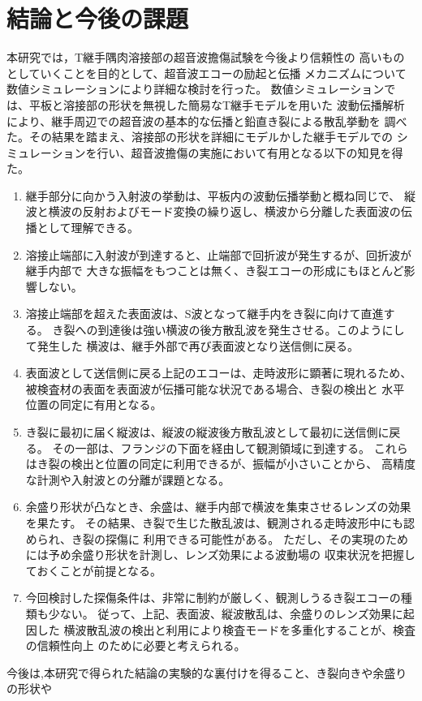 ﻿\documentclass[11pt,a4j]{mybook2}
\begin{document}
\chapter{結論と今後の課題}
本研究では，T継手隅肉溶接部の超音波擔傷試験を今後より信頼性の
高いものとしていくことを目的として、超音波エコーの励起と伝播
メカニズムについて数値シミュレーションにより詳細な検討を行った。
数値シミュレーションでは、平板と溶接部の形状を無視した簡易なT継手モデルを用いた
波動伝播解析により、継手周辺での超音波の基本的な伝播と鉛直き裂による散乱挙動を
調べた。その結果を踏まえ、溶接部の形状を詳細にモデルかした継手モデルでの
シミュレーションを行い、超音波擔傷の実施において有用となる以下の知見を得た。
\begin{enumerate}
\item
	継手部分に向かう入射波の挙動は、平板内の波動伝播挙動と概ね同じで、
	縦波と横波の反射およびモード変換の繰り返し、横波から分離した表面波の伝播として理解できる。
\item
	溶接止端部に入射波が到達すると、止端部で回折波が発生するが、回折波が継手内部で
	大きな振幅をもつことは無く、き裂エコーの形成にもほとんど影響しない。
\item
	溶接止端部を超えた表面波は、S波となって継手内をき裂に向けて直進する。
	き裂への到達後は強い横波の後方散乱波を発生させる。このようにして発生した
	横波は、継手外部で再び表面波となり送信側に戻る。
\item
	表面波として送信側に戻る上記のエコーは、走時波形に顕著に現れるため、
	被検査材の表面を表面波が伝播可能な状況である場合、き裂の検出と
	水平位置の同定に有用となる。
\item
	き裂に最初に届く縦波は、縦波の縦波後方散乱波として最初に送信側に戻る。
	その一部は、フランジの下面を経由して観測領域に到達する。
	これらはき裂の検出と位置の同定に利用できるが、振幅が小さいことから、
	高精度な計測や入射波との分離が課題となる。
\item
	余盛り形状が凸なとき、余盛は、継手内部で横波を集束させるレンズの効果を果たす。
	その結果、き裂で生じた散乱波は、観測される走時波形中にも認められ、き裂の探傷に
	利用できる可能性がある。
	ただし、その実現のためには予め余盛り形状を計測し、レンズ効果による波動場の
	収束状況を把握しておくことが前提となる。
\item
	今回検討した探傷条件は、非常に制約が厳しく、観測しうるき裂エコーの種類も少ない。
	従って、上記、表面波、縦波散乱は、余盛りのレンズ効果に起因した
	横波散乱波の検出と利用により検査モードを多重化することが、検査の信頼性向上
	のために必要と考えられる。
\end{enumerate}
今後は,本研究で得られた結論の実験的な裏付けを得ること、き裂向きや余盛りの形状や
\end{document}
